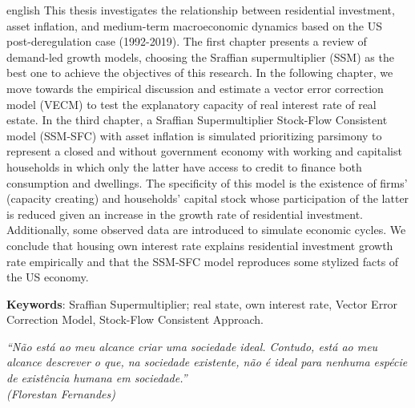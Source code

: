 \documentclass[12pt,openright,oneside,a4paper,brazil,main=english,sumario=tradicional]{gpsabntex}
\numberwithin{listing}{chapter}
\begin{document}
\begin{resumo}
\begin{otherlanguage*}{english}
	This thesis investigates the relationship between residential investment, asset inflation, and medium-term macroeconomic dynamics based on the US post-deregulation case  (1992-2019). 
	The first chapter presents a review of demand-led growth models, choosing the Sraffian supermultiplier (SSM) as the best one to achieve the objectives of this research. 
	In the following chapter, we move towards the empirical discussion and estimate a vector error correction model (VECM) to test the explanatory capacity of real interest rate of real estate. 
	In the third chapter, a Sraffian Supermultiplier Stock-Flow Consistent model (SSM-SFC) with asset inflation is simulated prioritizing parsimony to represent a closed and without government economy with working and capitalist households in which only the latter have access to credit to finance both consumption and dwellings. 
	The specificity of this model is the existence of firms' (capacity creating) and households' capital stock  whose participation of the latter is reduced given an increase in the growth rate of residential investment. 
	Additionally, some observed data are introduced to simulate economic cycles. 
 	We conclude that housing own interest rate explains residential investment growth rate empirically and that the SSM-SFC model reproduces some stylized facts of the US economy.
	
	\vspace{\onelineskip}
	
	\noindent\textbf{Keywords}: Sraffian Supermultiplier; real state, own interest rate, Vector Error Correction Model, Stock-Flow Consistent Approach. 
	
\end{otherlanguage*}
\end{resumo}

\begin{epigrafe}
\thispagestyle{empty} %
	\vspace*{\fill}
	\begin{flushright}
		\textit{``Não está ao meu alcance criar uma sociedade ideal. Contudo, está ao meu alcance descrever o que, na sociedade existente, não é ideal para nenhuma espécie de existência humana em sociedade.''\\
			(Florestan Fernandes)}
	\end{flushright}
\end{epigrafe}

\newpage

\listoffigures*
{}
\thispagestyle{empty}
\newpage
{}
\listoftables*
{}
\thispagestyle{empty}
\newpage
{}

\thispagestyle{empty}
\newpage
\end{document}
